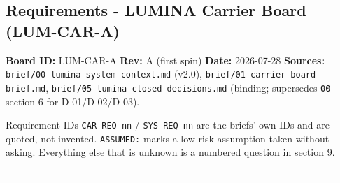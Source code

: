 \documentclass[11pt,a4paper]{article}
\begin{document}
\subsection*{Requirements - LUMINA Carrier Board (LUM-CAR-A)}
\textbf{Board ID:} LUM-CAR-A \textbar{} \textbf{Rev:} A (first spin) \textbar{} \textbf{Date:} 2026-07-28 \textbf{Sources:} \texttt{brief/00-lumina-system-context.md} (v2.0), \texttt{brief/01-carrier-board-brief.md}, \texttt{brief/05-lumina-closed-decisions.md} (binding; supersedes \texttt{00} section 6 for D-01/D-02/D-03).

Requirement IDs \texttt{CAR-REQ-nn} / \texttt{SYS-REQ-nn} are the briefs' own IDs and are quoted, not invented. \texttt{ASSUMED:} marks a low-risk assumption taken without asking. Everything else that is unknown is a numbered question in section 9.

---
\end{document}
